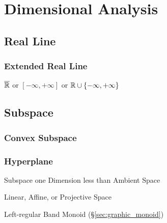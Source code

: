\section{Dimensional Analysis}\label{sec:dimensional_analysis}

\subsection{Real Line}\label{sec:real_line}

\subsubsection{Extended Real Line}\label{sec:extended_real_line}

$\overline{\mathbb{R}}$ or $[-\infty, +\infty]$ or $\mathbb{R} \cup \{
-\infty, +\infty\}$



\subsection{Subspace}\label{sec:subspace}




\subsubsection{Convex Subspace}\label{sec:convex_subspace}

\subsubsection{Hyperplane}\label{sec:hyperplane}

Subspace one Dimension less than Ambient Space

Linear, Affine, or Projective Space %

Left-regular Band Monoid (\S\ref{sec:graphic_monoid})



